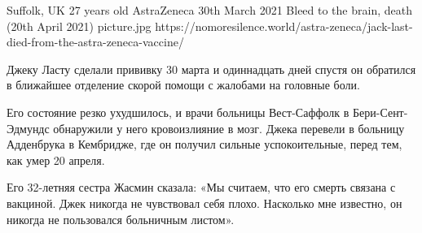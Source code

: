 {Suffolk, UK}
{27 years old}
{AstraZeneca}
{30th March 2021}
{Bleed to the brain, death (20th April 2021)}
{picture.jpg}
{https://nomoresilence.world/astra-zeneca/jack-last-died-from-the-astra-zeneca-vaccine/}
{

Джеку Ласту сделали прививку 30 марта и одиннадцать дней спустя он обратился в
ближайшее отделение скорой помощи с жалобами на головные боли.

Его состояние резко ухудшилось, и врачи больницы Вест-Саффолк в
Бери-Сент-Эдмундс обнаружили у него кровоизлияние в мозг. Джека перевели в
больницу Адденбрука в Кембридже, где он получил сильные успокоительные, перед
тем, как умер 20 апреля.

Его 32-летняя сестра Жасмин сказала: «Мы считаем, что его смерть связана с
вакциной. Джек никогда не чувствовал себя плохо. Насколько мне известно, он
никогда не пользовался больничным листом».

}
